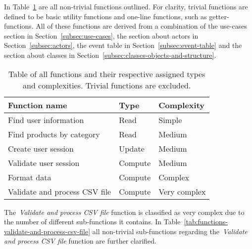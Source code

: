In Table~\ref{tab:functions} are all non-trivial functions outlined.
For clarity, trivial functions are defined to be basic utility functions and one-line functions, such as
getter-functions.
All of these functions are derived from a combination of the use-cases section in Section~\ref{subsec:use-cases},
the section about actors in Section~\ref{subsec:actors}, the event table in Section~\ref{subsec:event-table} and the
section about classes in Section~\ref{subsec:classes-objects-and-structure}.

\begin{table}[h]
    \begin{tabularx}{\textwidth}{ l X X }
        \toprule
        \textbf{Function name}
        & \textbf{Type}
        & \textbf{Complexity}
        \\ \midrule
        Find user information
        & Read
        & Simple
        \\ \midrule
        Find products by category
        & Read
        & Medium
        \\ \midrule
        Create user session
        & Update
        & Medium
        \\ \midrule
        Validate user session
        & Compute
        & Medium
        \\ \midrule
        Format data
        & Compute
        & Complex
        \\ \midrule
        Validate and process CSV file
        & Compute
        & Very complex
        \\ \bottomrule
    \end{tabularx}
    \caption{Table of all functions and their respective assigned types and complexities.
    Trivial functions are excluded.
    }\label{tab:functions}
\end{table}

The~\textit{Validate and process CSV file} function is classified as very complex due to the number of different
sub-functions it contains.
In Table~\ref{tab:functions-validate-and-process-csv-file} all non-trivial sub-functions regarding
the~\textit{Validate and process CSV file} function are further clarified.

